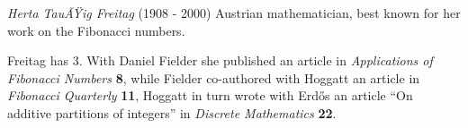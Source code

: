 \documentclass[12pt]{article}
\begin{document}
\emph{Herta TauÃŸig Freitag} (1908 - 2000) Austrian mathematician, best known for her work on the Fibonacci numbers.

Freitag has  3. With Daniel Fielder she published an article in {\it Applications of Fibonacci Numbers} {\bf 8}, while Fielder co-authored with Hoggatt an article in {\it Fibonacci Quarterly} {\bf 11}, Hoggatt in turn wrote with Erd\H{o}s an article ``On additive partitions of integers'' in {\it Discrete Mathematics} {\bf 22}.
\end{document}
